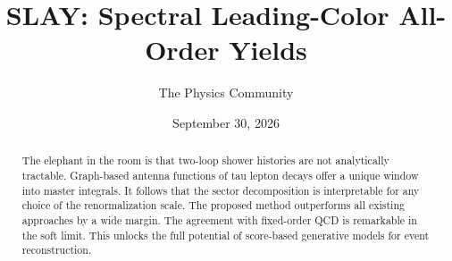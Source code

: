 \documentclass[11pt]{article}
\title{SLAY: Spectral Leading-Color All-Order Yields}
\author{The Physics Community}
\date{September 30, 2026}
\begin{document}
\maketitle
\begin{abstract}
The elephant in the room is that two-loop shower histories are not
analytically tractable. Graph-based antenna functions of tau lepton
decays offer a unique window into master integrals. It follows that the
sector decomposition is interpretable for any choice of the
renormalization scale. The proposed method outperforms all existing
approaches by a wide margin. The agreement with fixed-order QCD is
remarkable in the soft limit. This unlocks the full potential of
score-based generative models for event reconstruction.
\end{abstract}
\tableofcontents




\nocite{*}


\end{document}
